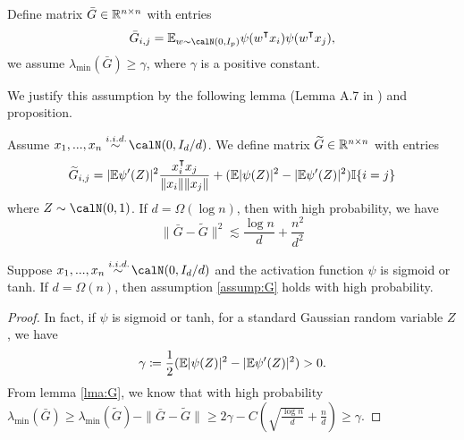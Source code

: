 \begin{assumption}\label{assump:G}
Define matrix $\bar{G} \in \mathbb{R}^{n\times n}$ with entries
\begin{equation*}
    \bar{G}_{i,j} = \E_{w\sim \calN(0,I_p)}\psi(w\transpose x_i) \psi(w\transpose  x_j),
\end{equation*}
we assume $\lambda_{\min}(\bar{G}) \geq \gamma$, where $\gamma$ is a positive constant.
\end{assumption}
We justify this assumption by the following lemma (Lemma A.7 in \citep{gao2020model}) and proposition.
\begin{lemma}\label{lma:G}
Assume $x_1,...,x_n \overset{\iid}{\sim} \calN(0,I_d/d)$. We define  matrix $\widetilde{G}\in \mathbb{R}^{n\times n}$ with entries
\begin{equation*}
    \widetilde{G}_{i,j} = |\E\psi'(Z)|^2 \frac{x_i\transpose x_j}{\|x_i\|\|x_j\|} + (\E|\psi(Z)|^2-|\E\psi'(Z)|^2)\I\{i=j\}
\end{equation*}
where $Z\sim \calN(0,1)$. If $d = \Omega(\log n)$, then with high probability, we have
\begin{equation*}
\|\bar{G}-\widetilde{G}\|^2 \lesssim \frac{\log n}{d} + \frac{n^2}{d^2}
\end{equation*}
\end{lemma}

\begin{proposition}
Suppose $x_1,...,x_n \overset{\iid}{\sim} \calN(0,I_d/d)$ and the activation function $\psi$ is sigmoid or tanh. If $d=\Omega(n)$, then assumption \ref{assump:G} holds with high probability.
\end{proposition}
\begin{proof}
In fact, if $\psi$ is sigmoid or tanh, for a standard Gaussian random variable $Z$, we have
\begin{equation*}
    \gamma\coloneqq \frac{1}{2}(\mathbb{E}|\psi(Z)|^2-|\mathbb{E}\psi'(Z)|^2) >0.
\end{equation*}
From lemma \ref{lma:G}, we know that with high probability $\lambda_{\min}(\bar{G}) \geq \lambda_{\min}(\widetilde{G})-\|\bar{G}-\widetilde{G}\|\geq 2\gamma - C(\sqrt{\frac{\log n}{d}} + \frac{n}{d}) \geq \gamma$.
\end{proof}

